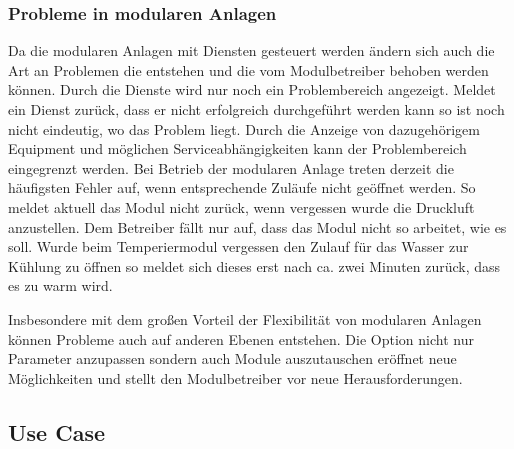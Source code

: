 \subsubsection{Probleme in modularen Anlagen}
Da die modularen Anlagen mit Diensten gesteuert werden ändern sich auch die Art an Problemen die entstehen und die vom Modulbetreiber behoben werden können. Durch die Dienste wird nur noch ein Problembereich angezeigt. Meldet ein Dienst zurück, dass er nicht erfolgreich durchgeführt werden kann so ist noch nicht eindeutig, wo das Problem liegt. Durch die Anzeige von dazugehörigem Equipment und möglichen Serviceabhängigkeiten kann der Problembereich eingegrenzt werden. Bei Betrieb der modularen Anlage treten derzeit die häufigsten Fehler auf, wenn entsprechende Zuläufe nicht geöffnet werden. So meldet aktuell das Modul nicht zurück, wenn vergessen wurde die Druckluft anzustellen. Dem Betreiber fällt nur auf, dass das Modul nicht so arbeitet, wie es soll. Wurde beim Temperiermodul vergessen den Zulauf für das Wasser zur Kühlung zu öffnen so meldet sich dieses erst nach ca. zwei Minuten zurück, dass es zu warm wird.

Insbesondere mit dem großen Vorteil der Flexibilität von modularen Anlagen können Probleme auch auf anderen Ebenen entstehen. Die Option nicht nur Parameter anzupassen sondern auch Module auszutauschen eröffnet neue Möglichkeiten und stellt den Modulbetreiber vor neue Herausforderungen. 

\subsection{Use Case}


